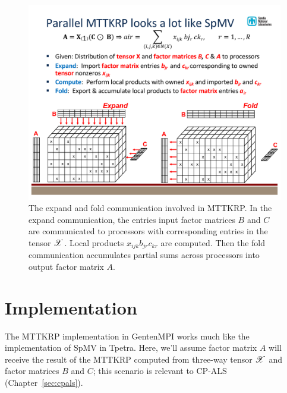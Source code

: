 \begin{figure}[ht]
   \centering
   \includegraphics[keepaspectratio=true, width=6.5in]{figs/mttkrp}
   \caption[The expand and fold communication involved in MTTKRP]{The expand and fold communication involved in MTTKRP.  In the expand communication, the entries input factor matrices $B$ and $C$ are communicated to processors with corresponding entries in the tensor $\X$.
Local products $x_{ijk} b_{jr} c_{kr}$ are computed. 
Then the fold communication 
accumulates partial sums across processors into output
factor matrix $A$.}
   \label{fig:mttkrp}
\end{figure}


\section{Implementation}

The MTTKRP implementation in GentenMPI works much like the implementation 
of SpMV in Tpetra.  Here, we'll assume factor matrix $A$ will receive the 
result of the MTTKRP computed from three-way tensor $\X$ and 
factor matrices $B$ and $C$; this scenario is relevant to CP-ALS 
(Chapter~\ref{sec:cpals}).

